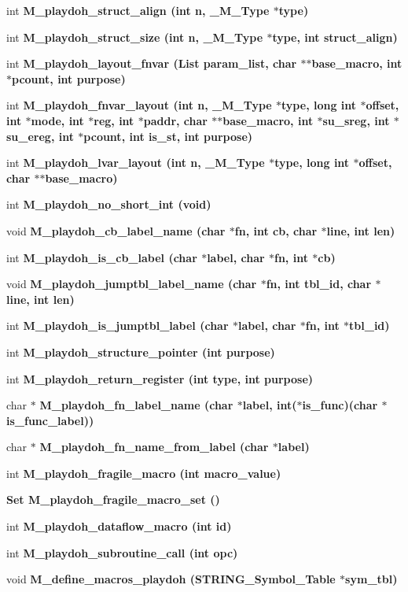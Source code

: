 \begin{CompactItemize}
int \bf{M\_\-playdoh\_\-struct\_\-align} (int n, \bf{\_\-M\_\-Type} $\ast$type)
\item 
int \bf{M\_\-playdoh\_\-struct\_\-size} (int n, \bf{\_\-M\_\-Type} $\ast$type, int struct\_\-align)
\item 
int \bf{M\_\-playdoh\_\-layout\_\-fnvar} (\bf{List} param\_\-list, char $\ast$$\ast$base\_\-macro, int $\ast$pcount, int purpose)
\item 
int \bf{M\_\-playdoh\_\-fnvar\_\-layout} (int n, \bf{\_\-M\_\-Type} $\ast$type, long int $\ast$offset, int $\ast$\bf{mode}, int $\ast$reg, int $\ast$paddr, char $\ast$$\ast$base\_\-macro, int $\ast$su\_\-sreg, int $\ast$su\_\-ereg, int $\ast$pcount, int is\_\-st, int purpose)
\item 
int \bf{M\_\-playdoh\_\-lvar\_\-layout} (int n, \bf{\_\-M\_\-Type} $\ast$type, long int $\ast$offset, char $\ast$$\ast$base\_\-macro)
\item 
int \bf{M\_\-playdoh\_\-no\_\-short\_\-int} (void)
\item 
void \bf{M\_\-playdoh\_\-cb\_\-label\_\-name} (char $\ast$fn, int cb, char $\ast$line, int len)
\item 
int \bf{M\_\-playdoh\_\-is\_\-cb\_\-label} (char $\ast$label, char $\ast$fn, int $\ast$cb)
\item 
void \bf{M\_\-playdoh\_\-jumptbl\_\-label\_\-name} (char $\ast$fn, int tbl\_\-id, char $\ast$line, int len)
\item 
int \bf{M\_\-playdoh\_\-is\_\-jumptbl\_\-label} (char $\ast$label, char $\ast$fn, int $\ast$tbl\_\-id)
\item 
int \bf{M\_\-playdoh\_\-structure\_\-pointer} (int purpose)
\item 
int \bf{M\_\-playdoh\_\-return\_\-register} (int type, int purpose)
\item 
char $\ast$ \bf{M\_\-playdoh\_\-fn\_\-label\_\-name} (char $\ast$label, int($\ast$is\_\-func)(char $\ast$is\_\-func\_\-label))
\item 
char $\ast$ \bf{M\_\-playdoh\_\-fn\_\-name\_\-from\_\-label} (char $\ast$label)
\item 
int \bf{M\_\-playdoh\_\-fragile\_\-macro} (int macro\_\-value)
\item 
\bf{Set} \bf{M\_\-playdoh\_\-fragile\_\-macro\_\-set} ()
\item 
int \bf{M\_\-playdoh\_\-dataflow\_\-macro} (int id)
\item 
int \bf{M\_\-playdoh\_\-subroutine\_\-call} (int opc)
\item 
void \bf{M\_\-define\_\-macros\_\-playdoh} (\bf{STRING\_\-Symbol\_\-Table} $\ast$sym\_\-tbl)
$$
\end{CompactItemize}
